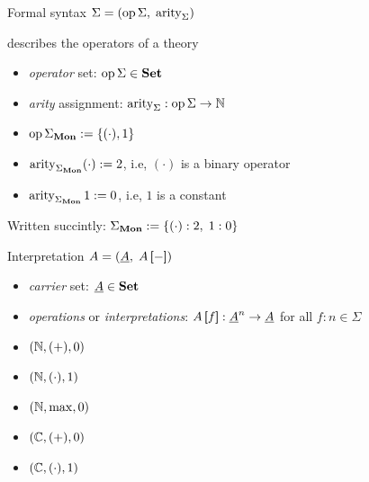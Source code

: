 \documentclass[10pt, english, xcolor={dvipsnames}]{beamer}
\begin{document}
\begin{frame}{Formal syntax}
   $\Sigma = (\operatorname{op} \Sigma,\; \operatorname{arity}_\Sigma)$

  describes the operators of a theory
  \begin{itemize}
    \item \emph{operator} set: $\operatorname{op}\Sigma \in \mathbf{Set}$ 
    \item \emph{arity} assignment: $\operatorname{arity}_\Sigma : \operatorname{op}\Sigma \to \mathbb N$
  \end{itemize}

  \vspace{0.5cm}
  \begin{itemize}
    \item $\operatorname{op}\Sigma_{\mathbf{Mon}} := \{(\cdot), 1\}$
    \item $\operatorname{arity}_{\Sigma_{\mathbf{Mon}}} (\cdot) := 2$, i.e, $(\cdot)$ is a binary operator
    \item $\operatorname{arity}_{\Sigma_{\mathbf{Mon}}} 1 := 0$, i.e, $1$ is a constant
  \end{itemize}
  Written succintly: $\Sigma_{\mathbf{Mon}} := \{(\cdot) : 2,\; 1 : 0\}$
\end{frame}

\begin{frame}{Interpretation}
   $A = (\underline{A},\; A \left[\!\!\!\:\left[ - \right]\!\!\!\:\right])$ 
  \begin{itemize}
    \item \emph{carrier} set: $\underline{A} \in \mathbf{Set}$
    \item \emph{operations} or \emph{interpretations}: $A\left[\!\!\!\:\left[ f \right]\!\!\!\:\right] : \underline{A}^n \to \underline{A}$ for all $f : n \in \Sigma$
  \end{itemize}

  \vspace{0.5cm}
  \begin{itemize}
    \item $(\mathbb N, (+), 0)$
    \item $(\mathbb N, (\cdot), 1)$
    \item $(\mathbb N, \max, 0)$
    \item $(\mathbb C, (+), 0)$
    \item $(\mathbb C, (\cdot), 1)$
  \end{itemize}
\end{frame}
\end{document}
